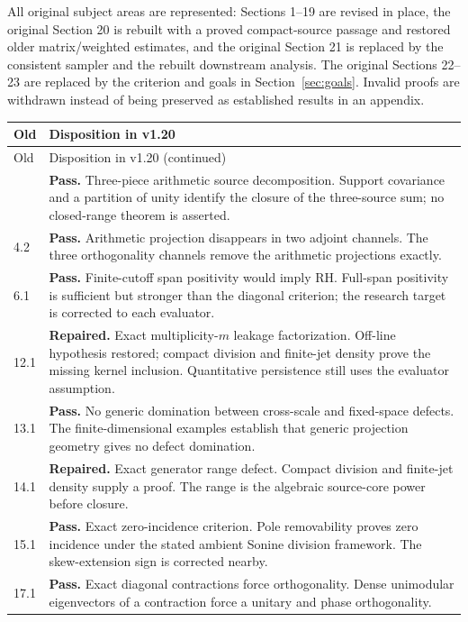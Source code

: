 \documentclass[11pt]{article}
\theoremstyle{remark}
\begin{document}
All original subject areas are represented: Sections 1--19 are revised in
place, the original Section 20 is rebuilt with a proved compact-source passage
and restored older matrix/weighted estimates, and the original Section 21
is replaced by the consistent sampler and the rebuilt downstream analysis.
The original Sections 22--23 are replaced by the criterion and goals in
Section~\ref{sec:goals}. Invalid proofs are withdrawn instead of being
preserved as established results in an appendix.

\small
\begin{longtable}{@{}p{}p{}@{}}
\toprule Old & Disposition in v1.20 \\
\midrule\endfirsthead
\toprule Old & Disposition in v1.20 (continued) \\
\midrule\endhead
\bottomrule\endfoot
4.1 & \textbf{Pass.} Three-piece arithmetic source decomposition. Support covariance and a partition of unity identify the closure of the three-source sum; no closed-range theorem is asserted. \\[4pt]
4.2 & \textbf{Pass.} Arithmetic projection disappears in two adjoint channels. The three orthogonality channels remove the arithmetic projections exactly. \\[4pt]
6.1 & \textbf{Pass.} Finite-cutoff span positivity would imply RH. Full-span positivity is sufficient but stronger than the diagonal criterion; the research target is corrected to each evaluator. \\[4pt]
12.1 & \textbf{Repaired.} Exact multiplicity-$m$ leakage factorization. Off-line hypothesis restored; compact division and finite-jet density prove the missing kernel inclusion. Quantitative persistence still uses the evaluator assumption. \\[4pt]
13.1 & \textbf{Pass.} No generic domination between cross-scale and fixed-space defects. The finite-dimensional examples establish that generic projection geometry gives no defect domination. \\[4pt]
14.1 & \textbf{Repaired.} Exact generator range defect. Compact division and finite-jet density supply a proof. The range is the algebraic source-core power before closure. \\[4pt]
15.1 & \textbf{Pass.} Exact zero-incidence criterion. Pole removability proves zero incidence under the stated ambient Sonine division framework. The skew-extension sign is corrected nearby. \\[4pt]
17.1 & \textbf{Pass.} Exact diagonal contractions force orthogonality. Dense unimodular eigenvectors of a contraction force a unitary and phase orthogonality. \\[4pt]

\end{longtable}
\end{document}
